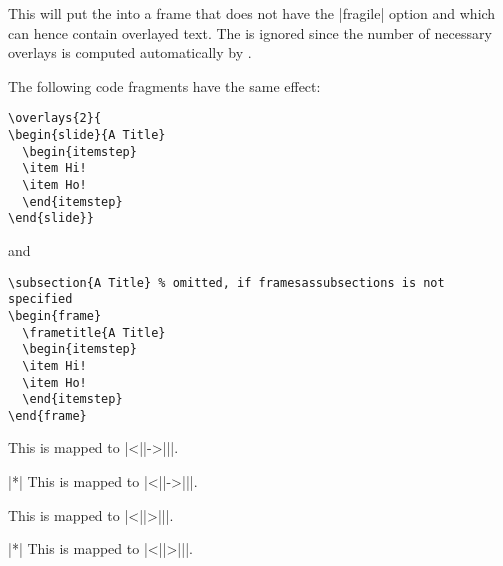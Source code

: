 \begin{command}{\overlays{}}
  This will put the  into a frame that does not have the |fragile| option and which can hence contain overlayed text. The  is ignored since the number of necessary overlays is computed automatically by \beamer.

  \example
  The following code fragments have the same effect:
\begin{verbatim}
\overlays{2}{
\begin{slide}{A Title}
  \begin{itemstep}
  \item Hi!
  \item Ho!
  \end{itemstep}
\end{slide}}
\end{verbatim}
  and
\begin{verbatim}
\subsection{A Title} % omitted, if framesassubsections is not specified
\begin{frame}
  \frametitle{A Title}
  \begin{itemstep}
  \item Hi!
  \item Ho!
  \end{itemstep}
\end{frame}
\end{verbatim}
\end{command}

\begin{command}{\fromSlide{}}
  This is mapped to |\uncover<||->{||}|.
\end{command}

\begin{command}{\fromSlide|*|}
  This is mapped to |\only<||->{||}|.
\end{command}

\begin{command}{\onlySlide{}}
  This is mapped to |\uncover<||>{||}|.
\end{command}

\begin{command}{\onlySlide|*|}
  This is mapped to |\only<||>{||}|.
\end{command}

